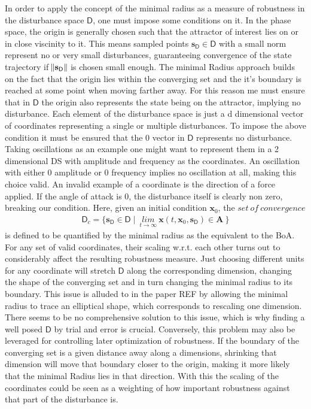     In order to apply the concept of the minimal radius as a measure of robustness in the disturbance space $\mathsf{D}$, one must impose some conditions on it.
    In the phase space, the origin is generally chosen such that the attractor of interest lies on or in close viscinity to it. This means sampled points $\mathbf{s}_{\mathsf{D}} \in \mathsf{D}$ with a small norm represent no or very small disturbances, guaranteeing convergence of the state trajectory if $\norm{\mathbf{s}_{\mathsf{D}}}$ is chosen small enough. The minimal Radius approach builds on the fact that the origin lies within the converging set and the it's boundary is reached at some point when moving farther away. 
    For this reason me must ensure that in $\mathsf{D}$ the origin also represents the state being on the attractor, implying no disturbance.
    Each element of the disturbance space is just a d dimensional vector of coordinates representing a single or multiple disturbances. To impose the above condition it must be ensured that the 0 vector in $\mathsf{D}$ represents no disturbance. 
    Taking oscillations as an example one might want to represent them in a 2 dimensional DS with amplitude and frequency as the coordinates. An oscillation with either 0 amplitude or 0 frequency implies no oscillation at all, making this choice valid.
    An invalid example of a coordinate is the direction of a force applied. If the angle of attack is 0, the disturbance itself is clearly non zero, breaking our condition.
    Here, given an initial condition $\mathbf{x}_0$, the $set\ of\ convergence$ 
    \begin{gather} \label{eq:9}
    \mathsf{D}_c = \{ \mathbf{s}_{\mathsf{D}} \in \mathsf{D} \mid\ \underset{t \rightarrow \infty}{lim} \ \mathbf{x}(t,\mathbf{x}_0,\mathbf{s}_{\mathsf{D}}) \in \mathbf{A}\ \}\end{gather}
    is defined to be quantified by the minimal radius as the equivalent to the BoA.
    For any set of valid coordinates, their scaling w.r.t. each other turns out to considerably affect the resulting robustness measure. Just choosing different units for any coordinate will stretch $\mathsf{D}$ along the corresponding dimension, changing the shape of the converging set and in turn changing the minimal radius to its boundary. This issue is alluded to in the paper REF by allowing the minimal radius to trace an elliptical shape, which corresponds to rescaling one dimension. There seems to be no comprehensive solution to this issue, which is why finding a well posed $\mathsf{D}$ by trial and error is crucial. 
    Conversely, this problem may also be leveraged for controlling later optimization of robustness. If the boundary of the converging set is a given distance away along a dimensions, shrinking that dimension will move that boundary closer to the origin, making it more likely that the minimal Radius lies in that direction. With this the scaling of the coordinates could be seen as a weighting of how important robustness against that part of the disturbance is. 

